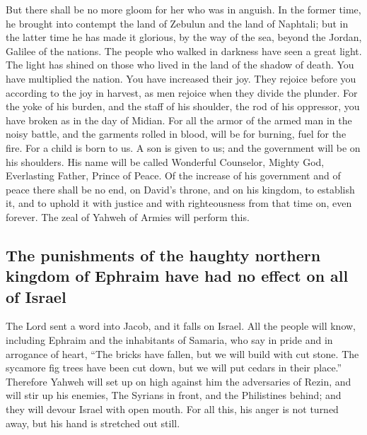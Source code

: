  But there shall be no more gloom for her who was in
anguish. In the former time, he brought into contempt the land of
Zebulun and the land of Naphtali; but in the latter time he has made it
glorious, by the way of the sea, beyond the Jordan, Galilee of the
nations.  The people who walked in darkness have seen a
great light. The light has shined on those who lived in the land of the
shadow of death.  You have multiplied the nation. You have
increased their joy. They rejoice before you according to the joy in
harvest, as men rejoice when they divide the plunder.  For
the yoke of his burden, and the staff of his shoulder, the rod of his
oppressor, you have broken as in the day of Midian.  For
all the armor of the armed man in the noisy battle, and the garments
rolled in blood, will be for burning, fuel for the fire. 
For a child is born to us. A son is given to us; and the government will
be on his shoulders. His name will be called Wonderful Counselor, Mighty
God, Everlasting Father, Prince of Peace.  Of the increase
of his government and of peace there shall be no end, on David's throne,
and on his kingdom, to establish it, and to uphold it with justice and
with righteousness from that time on, even forever. The zeal of Yahweh
of Armies will perform this.

\hypertarget{the-punishments-of-the-haughty-northern-kingdom-of-ephraim-have-had-no-effect-on-all-of-israel}{%
\subsection{The punishments of the haughty northern kingdom of Ephraim
have had no effect on all of
Israel}\label{the-punishments-of-the-haughty-northern-kingdom-of-ephraim-have-had-no-effect-on-all-of-israel}}

 The Lord sent a word into Jacob, and it falls on Israel.
 All the people will know, including Ephraim and the
inhabitants of Samaria, who say in pride and in arrogance of heart,
 ``The bricks have fallen, but we will build with cut
stone. The sycamore fig trees have been cut down, but we will put cedars
in their place.''  Therefore Yahweh will set up on high
against him the adversaries of Rezin, and will stir up his enemies,
 The Syrians in front, and the Philistines behind; and
they will devour Israel with open mouth. For all this, his anger is not
turned away, but his hand is stretched out still.

